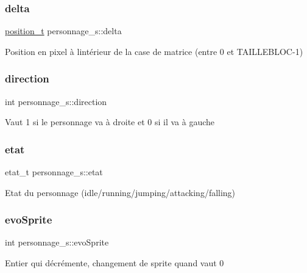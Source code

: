 \subsubsection{\texorpdfstring{delta}{delta}}
{\footnotesize\ttfamily \hyperlink{structposition__s}{position\+\_\+t} personnage\+\_\+s\+::delta}

Position en pixel à l\textquotesingle{}intérieur de la case de matrice (entre 0 et T\+A\+I\+L\+L\+E\+B\+L\+O\+C-\/1) \mbox{\label{structpersonnage__s_a6d6791f61e66ee9ee1125c39bc99f164}} 
\subsubsection{\texorpdfstring{direction}{direction}}
{\footnotesize\ttfamily int personnage\+\_\+s\+::direction}

Vaut 1 si le personnage va à droite et 0 si il va à gauche \mbox{\label{structpersonnage__s_a2d91f0a1a2e44164875be806c7a456cc}} 
\subsubsection{\texorpdfstring{etat}{etat}}
{\footnotesize\ttfamily etat\+\_\+t personnage\+\_\+s\+::etat}

Etat du personnage (idle/running/jumping/attacking/falling) \mbox{\label{structpersonnage__s_a47750ce89c5dcdb6844e0a98afd5fd75}} 
\subsubsection{\texorpdfstring{evo\+Sprite}{evoSprite}}
{\footnotesize\ttfamily int personnage\+\_\+s\+::evo\+Sprite}

Entier qui décrémente, changement de sprite quand vaut 0 \mbox{\label{structpersonnage__s_a1f1eb200420640259201a84300bccf7e}} 

